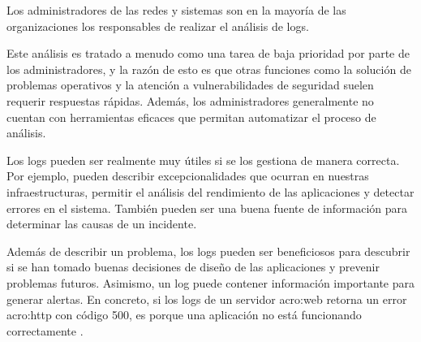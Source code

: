 Los administradores de las redes y sistemas son en la mayoría de las
organizaciones los responsables de realizar el análisis de logs.

Este análisis es tratado a menudo como una tarea de baja prioridad por parte de
los administradores, y la razón de esto es que otras funciones como la solución
de problemas operativos y la atención a vulnerabilidades de seguridad suelen
requerir respuestas rápidas. Además, los administradores generalmente no
cuentan con herramientas eficaces que permitan automatizar el proceso de
análisis.

Los logs pueden ser realmente muy útiles si se los gestiona de manera correcta.
Por ejemplo, pueden describir excepcionalidades que ocurran en nuestras
infraestructuras, permitir el análisis del rendimiento de las aplicaciones y
detectar errores en el sistema. También pueden ser una buena fuente de
información para determinar las causas de un incidente.

Además de describir un problema, los logs pueden ser beneficiosos para
descubrir si se han tomado buenas decisiones de diseño de las aplicaciones y
prevenir problemas futuros. Asimismo, un log puede contener información
importante para generar alertas. En concreto, si los logs de un servidor
\gls{acro:web} retorna un error \gls{acro:http} con código 500, es porque una
aplicación no está funcionando correctamente
\cite[p.~30-31]{monitoreo:logging_and_log_management}.

